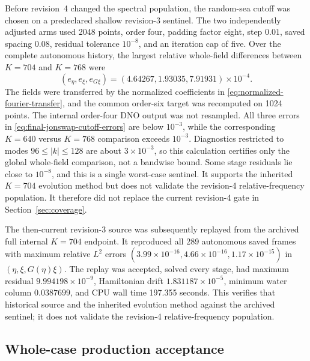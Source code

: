 \documentclass[11pt]{article}
\begin{document}
Before revision~4 changed the spectral population, the random-sea cutoff was
chosen on a predeclared shallow revision-3 sentinel.
The two independently adjusted arms used 2048 points, order four, padding
factor eight, step \(0.01\), saved spacing \(0.08\), residual tolerance
\(10^{-8}\), and an iteration cap of five.  Over the complete autonomous
history, the largest relative whole-field differences between \(K=704\) and
\(K=768\) were
\begin{equation}
  (e_\eta,e_\xi,e_{G\xi})
  =(4.64267,1.93035,7.91931)\times10^{-4}.
  \label{eq:final-jonswap-cutoff-errors}
\end{equation}
The fields were transferred by the normalized coefficients in
\eqref{eq:normalized-fourier-transfer}, and the common order-six target was
recomputed on 1024 points.  The internal order-four DNO output was not
resampled.  All three errors in \eqref{eq:final-jonswap-cutoff-errors} are
below \(10^{-3}\), while the corresponding \(K=640\) versus \(K=768\)
comparison exceeds \(10^{-3}\).  Diagnostics restricted to modes
\(96\le|k|\le128\) are about \(3\times10^{-3}\), so this calculation certifies
only the global whole-field comparison, not a bandwise bound.  Some stage
residuals lie close to \(10^{-8}\), and this is a single worst-case sentinel.
It supports the inherited $K=704$ evolution method but does not validate the
revision-4 relative-frequency population.  It therefore did not replace the
current revision-4 gate in Section~\ref{sec:coverage}.

The then-current revision-3 source was subsequently replayed from the archived
full internal \(K=704\) endpoint.  It reproduced all 289 autonomous saved
frames with maximum relative \(L^2\) errors
\((3.99\times10^{-16},4.66\times10^{-16},1.17\times10^{-15})\) in
\((\eta,\xi,G(\eta)\xi)\).  The replay was accepted, solved every stage, had
maximum residual \(9.994198\times10^{-9}\), Hamiltonian drift
\(1.831187\times10^{-5}\), minimum water column \(0.0387699\), and CPU wall
time 197.355 seconds.  This verifies that historical source and the inherited
evolution method against the archived sentinel; it does not validate the
revision-4 relative-frequency population.

\subsection{Whole-case production acceptance}
\end{document}
